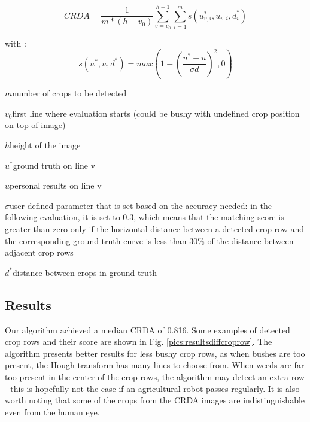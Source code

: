 \begin{equation}
CRDA = \frac{1}{m*(h-v_0)} \sum_{v=v_{0}}^{h-1} \sum_{i=1}^{m} s(u_{v,i}^{\ast}, u_{v,i}, d_{v}^{\ast})
 	\label{eq:my_equation}
\end{equation}

with : 
\begin{equation}
s(u^{\ast}, u, d^{\ast}) = max\left(1-\left(\frac{u^{\ast}-u}{\sigma d}\right)^{2}, 0\right)
 	\label{eq:my_equation}
\end{equation}

\newenvironment{conditions*}
  {\par\vspace{\abovedisplayskip}\noindent
   \tabularx{\columnwidth}{>{$}l<{$} @{}>{${}}c<{{}$}@{} >{\raggedright\arraybackslash}X}}
  {\endtabularx\par\vspace{\belowdisplayskip}}

\begin{eqexpl}[5mm]
\item{$m$}{number of crops to be detected}
\item{$v_0$}first line where evaluation starts (could be bushy with undefined crop position on top of image)
\item{$h$}height of the image
\item{$u^{\ast}$}ground truth on line v
\item{$u$}{personal results on line v}
\item{$\sigma$}user defined parameter that is set based on the accuracy needed: in the following evaluation, it is set to 0.3, which means that the matching score is greater than zero only if the horizontal distance between a detected crop row and the corresponding ground truth curve is less than 30\% of the distance between adjacent crop rows
\item{$d^{\ast}$}distance between crops in ground truth
\end{eqexpl}


\subsection{Results}
\label{sec:gliederung}

Our algorithm achieved a median CRDA of 0.816. 
Some examples of detected crop rows and their score are shown in Fig. \ref{pics:resultsdiffcroprow}. %
The algorithm presents better results for less bushy crop rows, as when bushes are too present, the Hough transform has many lines to choose from. When weeds are far too present in the center of the crop rows, the algorithm may detect an extra row - this is hopefully not the case if an agricultural robot passes regularly. It is also worth noting that some of the crops from the CRDA images are indistinguishable even from the human eye. \\

